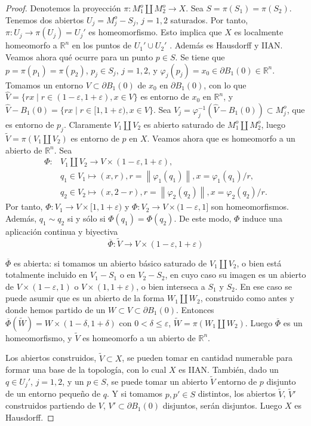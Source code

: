 \documentclass[10pt]{report}
\newcommand{\R}{\mathbb{R}}
\newcommand{\norm}[1]{\left\lVert#1\right\rVert} %
\theoremstyle{definition}
\begin{document}
\begin{proof}
Denotemos la proyección $\pi:M_1^o\amalg M_2^o\to X$. Sea $S=\pi (S_1)=\pi (S_2)$. Tenemos dos abiertos $U_j=M_j^o-S_j$, $j=1,2$ saturados. Por tanto, $\pi :U_ j\to \pi (U_j)=U_j'$ es homeomorfismo. Esto implica que $X$ es localmente homeomorfo a  $\R^n$ en los puntos de $U_1'\cup U_2'$ . Además es Hausdorff y IIAN.
Veamos ahora qué ocurre para un punto $p\in S$. Se tiene que $p=\pi (p_1)=\pi (p_2)$, $p_j\in S_j$, $j=1,2$, y $\varphi_j(p_j)=x_0 \in \partial B_1(0) \in \R^n$. Tomamos un entorno $V\subset \partial B_1(0)$ de $x_0$ en $\partial B_1(0)$, con lo que $\hat{V}=\{rx\mid   r\in (1-\varepsilon , 1+\varepsilon ), x\in V\}$ es entorno de $x_0$ en $\R^n$, y $\hat{V}-B_1(0)=\{rx\mid r\in [1, 1+\varepsilon ), x \in V\}$. Sea $V_j=\varphi_j^{-1}(\hat{V}-B_1(0))\subset M_j^o$, que es entorno de $p_j$. Claramente $V_1\amalg V_2$ es abierto saturado de $M_1^o\amalg M_2^o$, luego $\tilde{V}=\pi (V_1\amalg V_2)$ es entorno de $p$ en $X$. Veamos ahora que es homeomorfo a un abierto de $\R^n$. Sea
\begin{align*}
\Phi : & V_1\amalg V_2  \to  V\times (1-\varepsilon , 1+ \varepsilon ), \\
& q_1\in V_1  \mapsto  (x,r), r=\norm{\varphi_1(q_1)}, x=\varphi_1(q_1)/r,\\
& q_2\in V_2  \mapsto  (x,2-r), r= \norm{\varphi_2(q_2)}, x= \varphi_2(q_2)/r.
\end{align*}
Por tanto, $\Phi : V_1 \to V \times [1, 1+\varepsilon)$ y $\Phi : V_2 \to V \times (1- \varepsilon, 1]$ son homeomorfismos. Además, $q_1 \sim q_2$ si y sólo si $\Phi(q_1)=\Phi(q_2)$. De este modo, $\Phi$ induce una aplicación continua y biyectiva $$\overline{\Phi} : \tilde{V} \to V \times (1- \varepsilon, 1+ \varepsilon)$$

$\overline{\Phi}$ es abierta: si tomamos un abierto básico saturado de $V_1\amalg V_2$, o bien está totalmente incluido en $V_1-S_1$ o en $V_2-S_2$, en cuyo caso su imagen es un abierto de $V\times (1-\varepsilon ,1)$ o $V\times (1,1+\varepsilon )$, o bien interseca a $S_1$ y $S_2$. En ese caso se puede asumir que es un abierto de la forma $W_1\amalg W_2$, construido como antes y donde hemos partido de un $W\subset V \subset \partial B_1(0)$. Entonces $\overline{\Phi} (\tilde{W})= W \times (1-\delta , 1+\delta )$ con $0<\delta \leq \varepsilon$, $\tilde{W} = \pi (W_1 \amalg W_2)$. Luego $\overline{\Phi}$ es un homeomorfismo, y $\tilde{V}$ es homeomorfo a un abierto de $\R^n$.

Los abiertos construidos, $\tilde{V} \subset X$, se pueden tomar en cantidad numerable para formar una base de la topología, con lo cual $X$ es IIAN. También, dado un $q\in U_j'$, $j=1,2$, y un $p\in S$, se puede tomar un abierto $\tilde{V}$ entorno de $p$ disjunto de un entorno pequeño de $q$. Y si tomamos $p, p' \in S$ distintos, los abiertos $\tilde{V}$, $\tilde{V}'$ construidos partiendo de $V$, $V'\subset \partial B_1(0)$ disjuntos, serán disjuntos. Luego $X$ es Hausdorff.
\end{proof}
\end{document}
